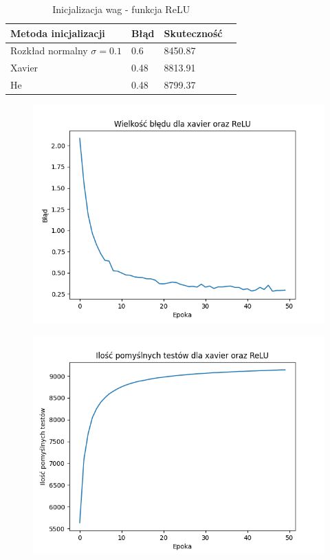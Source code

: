 \documentclass{article}
\begin{document}
\begin{table}[h]
  \centering
    
  \bgroup
  \def\arraystretch{1.3}
  \begin{tabular}{|l|l|l|l|}
  \hline
  Metoda inicjalizacji & Błąd & Skuteczność \\ \hline
  Rozkład normalny $\sigma = 0.1$ & 0.6 & 8450.87 \\ \hline
  Xavier & 0.48 & 8813.91 \\ \hline
  He & 0.48 & 8799.37 \\ \hline
  \end{tabular}
  \egroup
  \vspace{10pt}
  \caption{Inicjalizacja wag - funkcja ReLU}
\end{table}

\newpage
\begin{figure}[!htb]
  \centering
  \includegraphics[width=\linewidth]{error_xavier_ReLU.png}
\end{figure}

\begin{figure}[!htb]
  \centering
  \includegraphics[width=\linewidth]{test_xavier_ReLU.png}
\end{figure}
\end{document}
